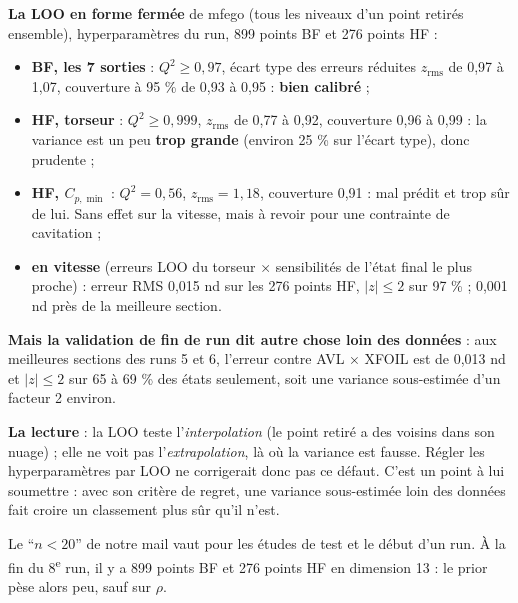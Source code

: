 \documentclass[11pt,a4paper]{article}
\begin{document}
\begin{preuve}
\textbf{La LOO en forme fermée} de mfego (tous les niveaux d'un point retirés ensemble), hyperparamètres du run,
899 points BF et 276 points HF :
\begin{itemize}
  \item \textbf{BF, les 7 sorties} : $Q^2\ge0{,}97$, écart type des erreurs réduites $z_{\text{rms}}$ de 0,97 à
        1,07, couverture à 95 \% de 0,93 à 0,95 : \textbf{bien calibré} ;
  \item \textbf{HF, torseur} : $Q^2\ge0{,}999$, $z_{\text{rms}}$ de 0,77 à 0,92, couverture 0,96 à 0,99 : la
        variance est un peu \textbf{trop grande} (environ 25 \% sur l'écart type), donc prudente ;
  \item \textbf{HF, $C_{p,\min}$} : $Q^2=0{,}56$, $z_{\text{rms}}=1{,}18$, couverture 0,91 : mal prédit et trop
        sûr de lui. Sans effet sur la vitesse, mais à revoir pour une contrainte de cavitation ;
  \item \textbf{en vitesse} (erreurs LOO du torseur × sensibilités de l'état final le plus proche) : erreur RMS
        0,015 nd sur les 276 points HF, $|z|\le2$ sur 97 \% ; 0,001 nd près de la meilleure section.
\end{itemize}
\textbf{Mais la validation de fin de run dit autre chose loin des données} : aux meilleures sections des runs 5
et 6, l'erreur contre AVL × XFOIL est de 0,013 nd et $|z|\le2$ sur 65 à 69 \% des états seulement, soit une
variance sous-estimée d'un facteur 2 environ.

\textbf{La lecture} : la LOO teste l'\emph{interpolation} (le point retiré a des voisins dans son nuage) ; elle ne
voit pas l'\emph{extrapolation}, là où la variance est fausse. Régler les hyperparamètres par LOO ne corrigerait
donc pas ce défaut. C'est un point à lui soumettre : avec son critère de regret, une variance sous-estimée loin
des données fait croire un classement plus sûr qu'il n'est.
\end{preuve}

\begin{attention}
Le \enquote{$n<20$} de notre mail vaut pour les études de test et le début d'un run. À la fin du
8\textsuperscript{e} run, il y a 899 points BF et 276 points HF en dimension 13 : le prior pèse alors peu, sauf
sur $\rho$.
\end{attention}

\end{document}
